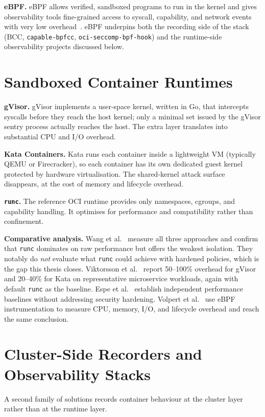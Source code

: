 \textbf{eBPF.} eBPF allows verified, sandboxed programs to run in the kernel and gives observability tools fine-grained access to syscall, capability, and network events with very low overhead~\cite{aich2021}. eBPF underpins both the recording side of the stack (BCC, \texttt{capable-bpfcc}, \texttt{oci-seccomp-bpf-hook}) and the runtime-side observability projects discussed below.

\section{Sandboxed Container Runtimes}

\textbf{gVisor.} gVisor implements a user-space kernel, written in Go, that intercepts syscalls before they reach the host kernel; only a minimal set issued by the gVisor sentry process actually reaches the host. The extra layer translates into substantial CPU and I/O overhead.

\textbf{Kata Containers.} Kata runs each container inside a lightweight VM (typically QEMU or Firecracker), so each container has its own dedicated guest kernel protected by hardware virtualisation. The shared-kernel attack surface disappears, at the cost of memory and lifecycle overhead.

\textbf{\texttt{runc}.} The reference OCI runtime provides only namespaces, cgroups, and capability handling. It optimises for performance and compatibility rather than confinement.

\textbf{Comparative analysis.} Wang et al.~\cite{wang2022} measure all three approaches and confirm that \texttt{runc} dominates on raw performance but offers the weakest isolation. They notably do \emph{not} evaluate what \texttt{runc} could achieve with hardened policies, which is the gap this thesis closes. Viktorsson et al.~\cite{viktorsson2020} report 50--100\% overhead for gVisor and 20--40\% for Kata on representative microservice workloads, again with default \texttt{runc} as the baseline. Espe et al.~\cite{espe2020} establish independent performance baselines without addressing security hardening. Volpert et al.~\cite{volpert2024} use eBPF instrumentation to measure CPU, memory, I/O, and lifecycle overhead and reach the same conclusion.

\section{Cluster-Side Recorders and Observability Stacks}

A second family of solutions records container behaviour at the cluster layer rather than at the runtime layer.

